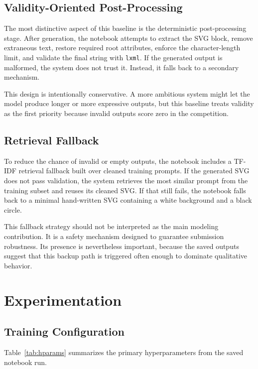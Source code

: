 \documentclass[11pt]{article}
\begin{document}
\subsection{Validity-Oriented Post-Processing}
The most distinctive aspect of this baseline is the deterministic post-processing stage. After generation, the notebook attempts to extract the SVG block, remove extraneous text, restore required root attributes, enforce the character-length limit, and validate the final string with \texttt{lxml}. If the generated output is malformed, the system does not trust it. Instead, it falls back to a secondary mechanism.

This design is intentionally conservative. A more ambitious system might let the model produce longer or more expressive outputs, but this baseline treats validity as the first priority because invalid outputs score zero in the competition.

\subsection{Retrieval Fallback}
To reduce the chance of invalid or empty outputs, the notebook includes a TF-IDF retrieval fallback built over cleaned training prompts. If the generated SVG does not pass validation, the system retrieves the most similar prompt from the training subset and reuses its cleaned SVG. If that still fails, the notebook falls back to a minimal hand-written SVG containing a white background and a black circle.

This fallback strategy should not be interpreted as the main modeling contribution. It is a safety mechanism designed to guarantee submission robustness. Its presence is nevertheless important, because the saved outputs suggest that this backup path is triggered often enough to dominate qualitative behavior.

\section{Experimentation}
\subsection{Training Configuration}
Table~\ref{tab:hparams} summarizes the primary hyperparameters from the saved notebook run.
\end{document}
